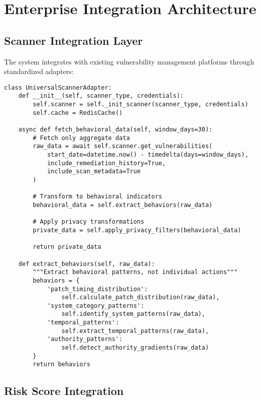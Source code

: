 \documentclass[11pt,a4paper]{article}
\begin{document}
\section{Enterprise Integration Architecture}

\subsection{Scanner Integration Layer}

The system integrates with existing vulnerability management platforms through standardized adapters:

\begin{lstlisting}[caption={Universal Scanner Adapter Pattern}]
class UniversalScannerAdapter:
    def __init__(self, scanner_type, credentials):
        self.scanner = self._init_scanner(scanner_type, credentials)
        self.cache = RedisCache()
        
    async def fetch_behavioral_data(self, window_days=30):
        # Fetch only aggregate data
        raw_data = await self.scanner.get_vulnerabilities(
            start_date=datetime.now() - timedelta(days=window_days),
            include_remediation_history=True,
            include_scan_metadata=True
        )
        
        # Transform to behavioral indicators
        behavioral_data = self.extract_behaviors(raw_data)
        
        # Apply privacy transformations
        private_data = self.apply_privacy_filters(behavioral_data)
        
        return private_data
    
    def extract_behaviors(self, raw_data):
        """Extract behavioral patterns, not individual actions"""
        behaviors = {
            'patch_timing_distribution': 
                self.calculate_patch_distribution(raw_data),
            'system_category_patterns': 
                self.identify_system_patterns(raw_data),
            'temporal_patterns': 
                self.extract_temporal_patterns(raw_data),
            'authority_patterns': 
                self.detect_authority_gradients(raw_data)
        }
        return behaviors
\end{lstlisting}

\subsection{Risk Score Integration}
\end{document}
